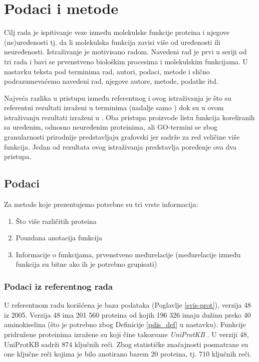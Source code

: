 
\chapter{Podaci i metode} %

\label{Podaci i metode} %

Cilj rada je ispitivanje veze između molekulske funkcije proteina i njegove\\ 
(ne)uređenosti tj. da li molekulska funkcija zavisi više od uređenosti ili
neuređenosti. Istraživanje je motivisano radom\parencite{Xie2007}. Navedeni rad
je prvi u seriji od tri rada i bavi se prvenstveno biološkim procesima i
molekulskim funkcijama.  U nastavku teksta pod terminima 
rad, autori, podaci, metode i slično podrazumevaćemo navedeni rad, njegove
autore, metode, podatke itd.

Najveća razlika u pristupu između referentnog i ovog istraživanja je što su
referentni rezultati izraženi u terminima  (nadalje samo ) dok su u ovom
istraživanju rezultati izraženi u . Oba pristupa
proizvode listu funkcija koreliranih sa uređenim, odnosno neuređenim
proteinima, ali GO-termini se zbog granularnosti prirodnije predstavljaju
grafovski jer sadrže za red veličine više funkcija. Jedan od rezultata ovog
istraživanja predstavlja poređenje ova dva pristupa.


\section {Podaci}

Za metode koje prezentujemo potrebne su tri vrste informacija:
\begin{enumerate}
  \item Što više različitih proteina
  \item Pouzdana anotacija funkcija
  \item Informacije o funkcijama, prvenstveno međurelacije (međurelacije između\\ funkcija su bitne  ako ih je potrebno grupisati)
\end{enumerate}


\subsection{Podaci iz referentnog rada}

U referentnom radu \parencite{Xie2007} korišćena je  baza podataka 
\keyword{\swissprot} (Poglavlje \ref{svis-prot}), verzija 48 iz 2005.
Verzija 48 ima 201 560 proteina od kojih 196 326 imaju dužinu preko 40
aminokiselina (što je potrebno zbog Definicije \ref{pdis_def} u nastavku). Funkcije
pridružene proteinima izražene su 
 koji čine takozvane \textit{UniProtKB} 
. U verziji 48, UniProtKB sadrži 874 ključnih reči.  Zbog
statističke značajnosti posmatrane su one ključne reči kojima je bilo anotirano
barem 20 proteina, tj. 710 ključnih reči.

